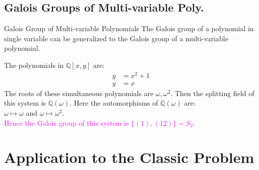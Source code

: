 \documentclass{beamer}
\begin{document}
\subsection{Galois Groups of Multi-variable Poly.}
\begin{frame}{Galois Group of Multi-variable Polynomials}
  The Galois group of a polynomial in single variable can be generalized to the Galois group of a multi-variable polynomial.



\vspace{7mm}
 \begin{tcolorbox}[colback=white, colframe=brown!80!black, boxsep=1mm, title={\bfseries \color{white} Example}]
  The polynomials in \(\mathbb{Q}[x,y]\) are: \begin{align}
                         y &= x^2+1 \\
                         y&=x
                       \end{align}
                       The roots of these simultaneous polynomials are \(\omega, {\omega}^2\). Then the splitting field of this system is \(\mathbb{Q}(\omega)\). Here the automorphisms of \(\mathbb{Q}(\omega)\) are: \\
       \(\omega \longmapsto \omega\) and \hspace{9mm} \(\omega \longmapsto {\omega}^2\).\\
                       \textcolor{magenta}{Hence the Galois group of this system is \(\{(1), (12)\} = S_2\)}.
\end{tcolorbox}
\end{frame}

\section{Application to the Classic Problem}
\end{document}
